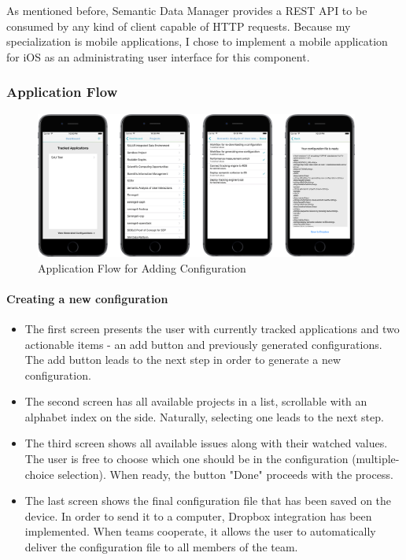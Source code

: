 As mentioned before, Semantic Data Manager provides a REST API to be consumed by any kind of client capable of HTTP requests. Because my specialization is mobile applications, I chose to implement a mobile application for iOS as an administrating user interface for this component.

\subsubsection{Application Flow}

\begin{figure}[!ht]
	\centering
	\includegraphics[width=0.95\textwidth]{figures/04_implementation/add_flow}
    \caption{Application Flow for Adding Configuration}
\end{figure}

\paragraph{Creating a new configuration}

\begin{itemize}
	\item The first screen presents the user with currently tracked applications and two actionable items - an add button and previously generated configurations. The add button leads to the next step in order to generate a new configuration.
	\item The second screen has all available projects in a list, scrollable with an alphabet index on the side. Naturally, selecting one leads to the next step.
	\item The third screen shows all available issues along with their watched values. The user is free to choose which one should be in the configuration (multiple-choice selection). When ready, the button "Done" proceeds with the process.
	\item The last screen shows the final configuration file that has been saved on the device. In order to send it to a computer, Dropbox integration has been implemented. When teams cooperate, it allows the user to automatically deliver the configuration file to all members of the team.
\end{itemize}

